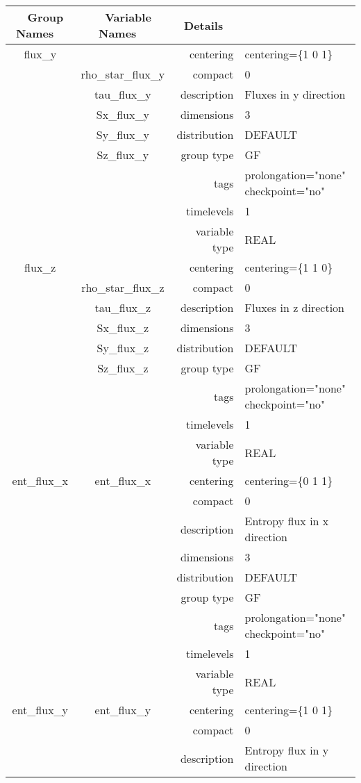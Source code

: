 \begin{tabular*}{150mm}{|c|c@{\extracolsep{\fill}}|rl|} \hline 
~ {\bf Group Names} ~ & ~ {\bf Variable Names} ~  &{\bf Details} ~ & ~ \\ 
\hline 
flux\_y &  & centering & centering=\{1 0 1\} \\ 
 & rho\_star\_flux\_y & compact & 0 \\ 
 & tau\_flux\_y & description & Fluxes in y direction \\ 
 & Sx\_flux\_y & dimensions & 3 \\ 
 & Sy\_flux\_y & distribution & DEFAULT \\ 
 & Sz\_flux\_y & group type & GF \\ 
 &  & tags & prolongation="none" checkpoint="no" \\ 
 &  & timelevels & 1 \\ 
 &  & variable type & REAL \\ 
\hline 
flux\_z &  & centering & centering=\{1 1 0\} \\ 
 & rho\_star\_flux\_z & compact & 0 \\ 
 & tau\_flux\_z & description & Fluxes in z direction \\ 
 & Sx\_flux\_z & dimensions & 3 \\ 
 & Sy\_flux\_z & distribution & DEFAULT \\ 
 & Sz\_flux\_z & group type & GF \\ 
 &  & tags & prolongation="none" checkpoint="no" \\ 
 &  & timelevels & 1 \\ 
 &  & variable type & REAL \\ 
\hline 
ent\_flux\_x & ent\_flux\_x & centering & centering=\{0 1 1\} \\ 
 &  & compact & 0 \\ 
 &  & description & Entropy flux in x direction \\ 
 &  & dimensions & 3 \\ 
 &  & distribution & DEFAULT \\ 
 &  & group type & GF \\ 
 &  & tags & prolongation="none" checkpoint="no" \\ 
 &  & timelevels & 1 \\ 
 &  & variable type & REAL \\ 
\hline 
ent\_flux\_y & ent\_flux\_y & centering & centering=\{1 0 1\} \\ 
 &  & compact & 0 \\ 
 &  & description & Entropy flux in y direction \\ 

\end{tabular*}
